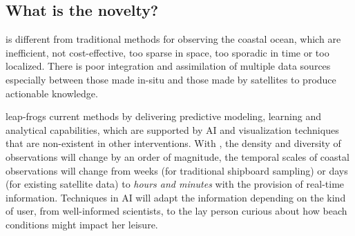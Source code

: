 \documentclass[12pt]{article}
\begin{document}




\vspace*{0.1cm}
\subsection{What is the novelty?}

\pro is different from traditional methods for observing the coastal
ocean, which are inefficient, not cost-effective, too sparse in space,
too sporadic in time or too localized. There is poor integration and
assimilation of multiple data sources especially between those made
in-situ and those made by satellites to produce actionable knowledge.

\pro leap-frogs current methods by delivering predictive modeling,
learning and analytical capabilities, which are supported by AI and
visualization techniques that are non-existent in other interventions.
With \proe, the density and diversity of observations will change by an
order of magnitude, the temporal scales of coastal observations will
change from weeks (for traditional shipboard sampling) or days (for
existing satellite data) to \emph{hours and minutes} with the
provision of real-time information. Techniques in AI will adapt the
information depending on the kind of user, from well-informed
scientists, to the lay person curious about how beach conditions might
impact her leisure. 
\end{document}
